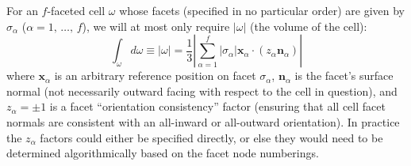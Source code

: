 \documentclass[11pt]{article} %
\begin{document}
For an $f$-faceted cell $\omega$ whose facets (specified in no particular order) are given by $\sigma_\alpha$ ($\alpha = 1, \, \ldots, \, f$), we will at most only require $|\omega|$ (the volume of the cell):
\begin{equation}
	\int_{\omega} d \omega \equiv | \omega | = \frac{1}{3} \left| \sum_{\alpha=1}^f | \sigma_{\alpha} | \mathbf{x}_{\alpha} \cdot (z_\alpha \mathbf{n}_{\alpha}) \right|
\end{equation}
where $\mathbf{x}_\alpha$ is an arbitrary reference position on facet $\sigma_\alpha$, $\mathbf{n}_\alpha$ is the facet's surface normal (not necessarily outward facing with respect to the cell in question), and $z_\alpha = \pm 1$ is a facet ``orientation consistency'' factor (ensuring that all cell facet normals are consistent with an all-inward or all-outward orientation). In practice the $z_\alpha$ factors could either be specified directly, or else they would need to be determined algorithmically based on the facet node numberings.
\end{document}
